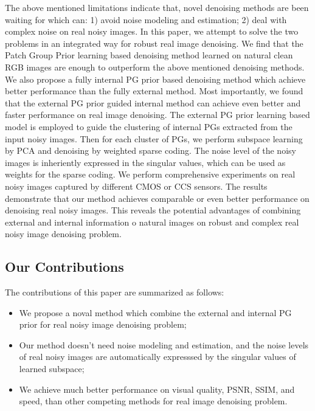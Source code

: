 \documentclass[10pt,twocolumn,letterpaper]{article}
\begin{document}
The above mentioned limitations indicate that, novel denoising methods are been waiting for which can: 1) avoid noise modeling and estimation; 2) deal with complex noise on real noisy images. In this paper, we attempt to solve the two problems in an integrated way for robust real image denoising. We find that the Patch Group Prior learning based denoising \cite{PGPD} method learned on natural clean RGB images are enough to outperform the above mentioned denoising methods. We also propose a fully internal PG prior based denoising method which achieve better performance than the fully external method. Most importantly, we found that the external PG prior guided internal method can achieve even better and faster performance on real image denoising. The external PG prior learning based model is employed to guide the clustering of internal PGs extracted from the input noisy images. Then for each cluster of PGs, we perform subspace learning by PCA and denoising by weighted sparse coding. The noise level of the noisy images is inheriently expressed in the singular values, which can be used as weights for the sparse coding. We perform comprehensive experiments on real noisy images captured by different CMOS or CCS sensors. The results demonstrate that our method achieves comparable or even better performance on denoising real noisy images. This reveals the potential advantages of combining external and internal information o natural images on robust and complex real noisy image denoising problem.


\subsection{Our Contributions}
The contributions of this paper are summarized as follows:
\begin{itemize}
\item We propose a noval method which combine the external and internal PG prior for real noisy image denoising problem;
\item Our method doesn't need noise modeling and estimation, and the noise levels of real noisy images are automatically expresssed by the singular values of learned subspace;
\item We achieve much better performance on visual quality, PSNR, SSIM, and speed, than other competing methods for real image denoising problem.
\end{itemize}
\end{document}
